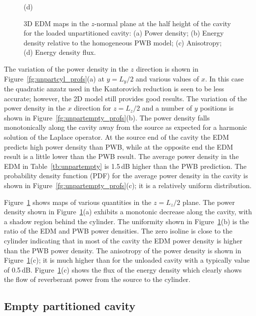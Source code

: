 \documentclass[a4paper]{article}
\numberwithin{equation}{section}
\newcounter{Table}
\newcounter{Figure}
\begin{document}
\begin{figure}[hp]
\begin{center}
{\footnotesize (d)}\\
\vspace{-2mm}
\caption{\label{fg:unpartcyl_maps} 3D EDM maps in the $z$-normal plane at the half height of the cavity for the 
loaded unpartitioned cavity: (a) Power density; (b) Energy density relative to the homogeneous PWB model;
(c) Anisotropy; (d) Energy density flux.}
\end{center}
\end{figure}

The variation of the power density in the $z$ direction is shown in Figure~\ref{fg:unpartcyl_profs}(a)
at $y=L_y/2$ and various values of $x$. In this case the quadratic anzatz used in the Kantorovich reduction
is seen to be less accurate; however, the 2D model still provides good results. The variation of the power density 
in the $x$ direction for $z=L_z/2$ and a number of $y$ positions is shown in Figure~\ref{fg:unpartempty_profs}(b).
The power density falls monotonically along the cavity away from the source as expected for a harmonic solution
of the Laplace operator. At the source end of the cavity the EDM predicts high power density than PWB, while 
at the opposite end the EDM result is a little lower than the PWB result. The average power density in the EDM in 
Table~\ref{tb:unpartempty} is 1.5\,dB higher than the PWB prediction. The probability density function (PDF)
for the average power density in the cavity is shown in Figure~\ref{fg:unpartempty_profs}(c); it is a relatively
uniform distribution.

Figure~\ref{fg:unpartcyl_maps} shows maps of various quantities in the $z=L_z/2$ plane. The power density
shown in Figure~\ref{fg:unpartcyl_maps}(a) exhibits a monotonic decrease along the cavity, with a shadow
region behind the cylinder. The uniformity shown in Figure~\ref{fg:unpartcyl_maps}(b)
is the ratio of the EDM and PWB power densities. The zero isoline is close to the cylinder indicating that in most of 
the cavity the EDM power density is higher than the PWB power density. The anisotropy of the power density is shown in
Figure~\ref{fg:unpartcyl_maps}(c); it is much higher than for the unloaded cavity with a typically value of 0.5\,dB.
Figure~\ref{fg:unpartcyl_maps}(c) shows the flux of the energy density which clearly shows the flow of reverberant power from 
the source to the cylinder. 

\subsection[Empty partitioned cavity]{Empty partitioned cavity}
\label{sc:res:emptypart}
\end{document}
